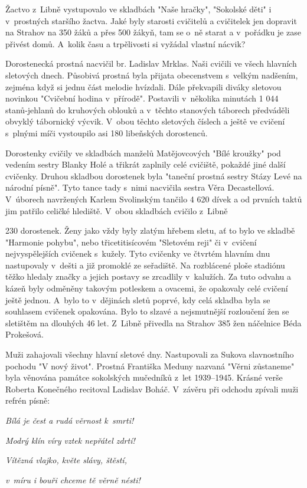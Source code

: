 \documentclass[a5paper, 11pt, twoside]{article}
\begin{document}
Žactvo z~Libně vystupovalo ve skladbách "Naše hračky", "Sokolské děti"
i v~prostných staršího žactva. Jaké byly starosti cvičitelů a cvičitelek
jen dopravit na Strahov na 350 žáků a přes 500 žákyň, tam se o~ně starat
a v~pořádku je zase přivést domů. A~kolik času a trpělivosti si vyžádal
vlastní nácvik?

Dorostenecká prostná nacvičil br. Ladislav Mrklas. Naši cvičili ve všech
hlavních sletových dnech. Působivá prostná byla přijata obecenstvem
s~velkým nadšením, zejména když si jednu část melodie hvízdali. Dále
překvapili diváky sletovou novinkou "Cvičební hodina v~přírodě".
Postavili v~několika minutách 1 044 stanů-jehlanů do kruhových oblouků a
v~těchto stanových táborech předváděli obvyklý tábornický výcvik. V~obou
těchto sletových číslech a ještě ve cvičení s~plnými míči vystoupilo asi
180 libeňských dorostenců.

Dorostenky cvičily ve skladbách manželů Matějovcových "Bílé kroužky"
pod vedením sestry Blanky Holé a třikrát zaplnily celé cvičiště, pokaždé
jiné další cvičenky. Druhou skladbou dorostenek byla "taneční prostná
sestry Stázy Levé na národní písně". Tyto tance tady s~nimi nacvičila
sestra Věra Decastellová. V~úborech navržených Karlem Svolinským tančilo
4 620 dívek a od prvních taktů jim patřilo celičké hlediště. V~obou
skladbách cvičilo z~Libně

230 dorostenek. Ženy jako vždy byly zlatým hřebem sletu, ať to bylo ve
skladbě "Harmonie pohybu", nebo třicetitisícovém "Sletovém reji" či
v~cvičení nejvyspělejších cvičenek s~kužely. Tyto cvičenky ve čtvrtém
hlavním dnu nastupovaly v~dešti a již promoklé ze seřadiště. Na
rozblácené ploše stadiónu těžko hledaly značky a jejich postavy se
zrcadlily v~kalužích. Za tuto odvahu a kázeň byly odměněny takovým
potleskem a ovacemi, že opakovaly celé cvičení ještě jednou. A~bylo to
v~dějinách sletů poprvé, kdy celá skladba byla se souhlasem cvičenek
opakována. Bylo to slzavé a nejsmutnější rozloučení žen se sletištěm na
dlouhých 46 let. Z~Libně přivedla na Strahov 385 žen náčelnice Béda
Prokešová.

Muži zahajovali všechny hlavní sletové dny. Nastupovali za Sukova
slavnostního pochodu "V nový život". Prostná Františka Meduny nazvaná
"Věrni zůstaneme" byla věnována památce sokolských mučedníků z~let
1939--1945. Krásné verše Roberta Konečného recitoval Ladislav
Boháč. V~závěru při odchodu zpívali muži refrén písně:

\begin{center}
  
\textit{Bílá je čest a rudá věrnost k~smrti!}

\textit{Modrý klín víry vztek nepřátel zdrtí!}

\textit{Vítězná vlajko, květe slávy, štěstí,}

\textit{v~míru i bouři chceme tě věrně nésti!}
\end{center}
\end{document}
